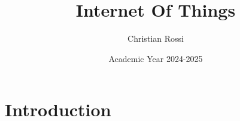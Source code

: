 \documentclass[12pt, a4paper]{report}
\title{\textbf{Internet Of Things}}
\author{Christian Rossi}
\date{Academic Year 2024-2025}
\begin{document}
    \maketitle

    

    \cleardoublepage{}

    \tableofcontents

    \cleardoublepage{}

    \chapter{Introduction}
    
    
\end{document}
